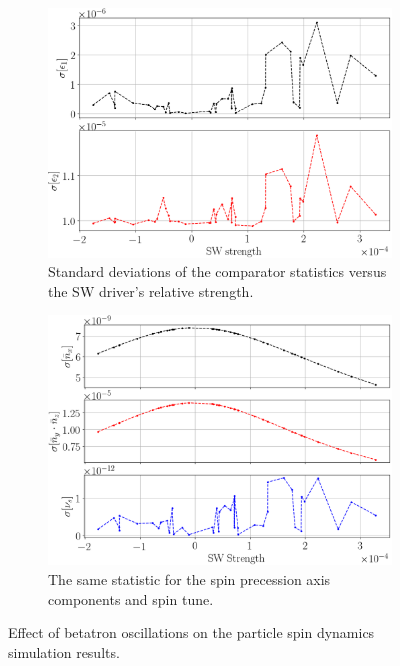 \documentclass[]{elsarticle}
\begin{document}
\begin{figure}[h]\centering
  \begin{subfigure}{\linewidth}
    \includegraphics[width=\linewidth]{img/smp_sim/residual_SD_vs_SW(both)}
    \caption{Standard deviations of the comparator statistics versus the SW driver's
    relative strength.\label{fig:smp:resid}}
  \end{subfigure} 
  \begin{subfigure}{\linewidth}
    \includegraphics[width=\linewidth]{img/smp_sim/NBAR_variation_sd_vs_SW}
    \caption{The same statistic for the spin precession axis components and spin tune.\label{fig:smp:NBAR}}
  \end{subfigure}
  \caption{Effect of betatron oscillations on the particle spin dynamics simulation results.\label{fig:smp}}
\end{figure}
\end{document}
